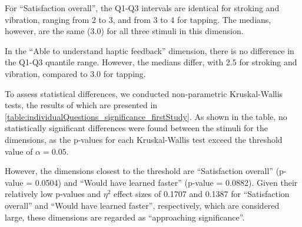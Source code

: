 For \enquote{Satisfaction overall}, the Q1-Q3 intervals are identical for stroking and vibration, ranging from 2 to 3, and from 3 to 4 for tapping. The medians, however, are the same (3.0) for all three stimuli in this dimension.

In the \enquote{Able to understand haptic feedback} dimension, there is no difference in the Q1-Q3 quantile range. However, the medians differ, with 2.5 for stroking and vibration, compared to 3.0 for tapping.


To assess statistical differences, we conducted non-parametric Kruskal-Wallis tests, the results of which are presented in \autoref{table:individualQuestions_significance_firstStudy}.
As shown in the table, no statistically significant differences were found between the stimuli for the dimensions, as the p-values for each Kruskal-Wallis test exceed the threshold value of $\alpha=0.05$.

However, the dimensions closest to the threshold are \enquote{Satisfaction overall} (p-value = 0.0504) and \enquote{Would have learned faster} (p-value = 0.0882). Given their relatively low p-values and \(\eta^2\) effect sizes of 0.1707 and 0.1387 for \enquote{Satisfaction overall} and \enquote{Would have learned faster}, respectively, which are considered large, these dimensions are regarded as \enquote{approaching significance}.

